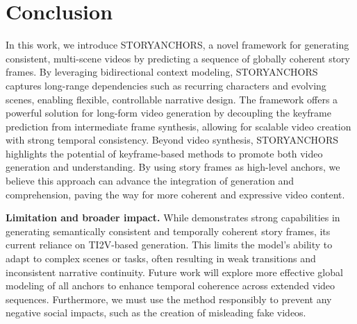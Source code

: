 \section{Conclusion}
\label{sec:con}
In this work, we introduce STORYANCHORS, a novel framework for generating consistent, multi-scene videos by predicting a sequence of globally coherent story frames. By leveraging bidirectional context modeling, STORYANCHORS captures long-range dependencies such as recurring characters and evolving scenes, enabling flexible, controllable narrative design. The framework offers a powerful solution for long-form video generation by decoupling the keyframe prediction from intermediate frame synthesis, allowing for scalable video creation with strong temporal consistency.
Beyond video synthesis, STORYANCHORS highlights the potential of keyframe-based methods to promote both video generation and understanding. By using story frames as high-level anchors, we believe this approach can advance the integration of generation and comprehension, paving the way for more coherent and expressive video content. 

\textbf{Limitation and broader impact.}
While \ours{} demonstrates strong capabilities in generating semantically consistent and temporally coherent story frames, its current reliance on TI2V-based generation. 
This limits the model’s ability to adapt to complex scenes or tasks, often resulting in weak transitions and inconsistent narrative continuity. Future work will explore more effective global modeling of all anchors to enhance temporal coherence across extended video sequences. 
Furthermore, we must use the method responsibly to prevent any negative social impacts, such as the creation of misleading fake videos.